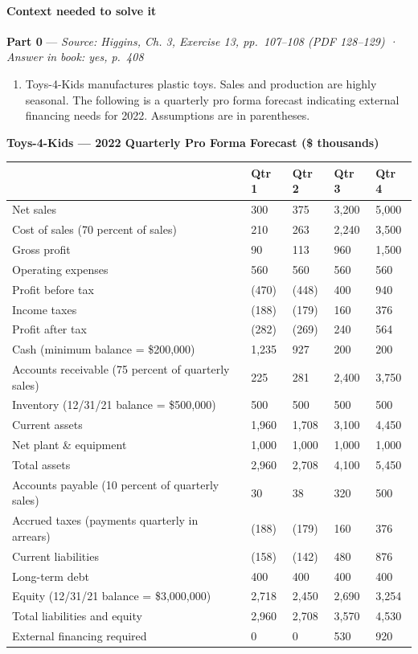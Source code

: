 \documentclass[11pt,a4paper]{article}
\providecommand{\tightlist}{\setlength{\itemsep}{0pt}\setlength{\parskip}{0pt}}
\begin{document}
\paragraph{Context needed to solve it}

\textbf{Part 0} --- \emph{Source: Higgins, Ch. 3, Exercise 13, pp.~107--108 (PDF 128--129) · Answer
in book: yes, p.~408}

\begin{enumerate}
\def\labelenumi{\arabic{enumi}.}
\setcounter{enumi}{12}
\tightlist
\item
  Toys-4-Kids manufactures plastic toys. Sales and production are highly seasonal. The following is
  a quarterly pro forma forecast indicating external financing needs for 2022. Assumptions are in
  parentheses.
\end{enumerate}

\textbf{Toys-4-Kids --- 2022 Quarterly Pro Forma Forecast (\$ thousands)}

{\def\LTcaptype{none} %
\begin{longtable}[]{@{}lllll@{}}
\toprule\noalign{}
& Qtr 1 & Qtr 2 & Qtr 3 & Qtr 4 \\
\midrule\noalign{}
\endhead
\bottomrule\noalign{}
\endlastfoot
Net sales & 300 & 375 & 3,200 & 5,000 \\
Cost of sales (70 percent of sales) & 210 & 263 & 2,240 & 3,500 \\
Gross profit & 90 & 113 & 960 & 1,500 \\
Operating expenses & 560 & 560 & 560 & 560 \\
Profit before tax & (470) & (448) & 400 & 940 \\
Income taxes & (188) & (179) & 160 & 376 \\
Profit after tax & (282) & (269) & 240 & 564 \\
Cash (minimum balance = \$200,000) & 1,235 & 927 & 200 & 200 \\
Accounts receivable (75 percent of quarterly sales) & 225 & 281 & 2,400 & 3,750 \\
Inventory (12/31/21 balance = \$500,000) & 500 & 500 & 500 & 500 \\
Current assets & 1,960 & 1,708 & 3,100 & 4,450 \\
Net plant \& equipment & 1,000 & 1,000 & 1,000 & 1,000 \\
Total assets & 2,960 & 2,708 & 4,100 & 5,450 \\
Accounts payable (10 percent of quarterly sales) & 30 & 38 & 320 & 500 \\
Accrued taxes (payments quarterly in arrears) & (188) & (179) & 160 & 376 \\
Current liabilities & (158) & (142) & 480 & 876 \\
Long-term debt & 400 & 400 & 400 & 400 \\
Equity (12/31/21 balance = \$3,000,000) & 2,718 & 2,450 & 2,690 & 3,254 \\
Total liabilities and equity & 2,960 & 2,708 & 3,570 & 4,530 \\
External financing required & 0 & 0 & 530 & 920 \\
\end{longtable}
}
\end{document}
